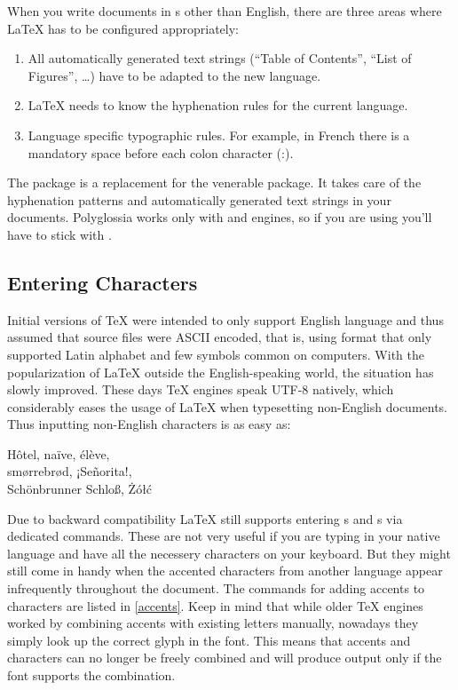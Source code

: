 When you write documents in s other than English, there are three
areas where \LaTeX{} has to be configured appropriately:

\begin{enumerate}
  \item All automatically generated text strings (\enquote{Table of Contents},
        \enquote{List of Figures}, \ldots) have to be adapted to the new
        language.
  \item \LaTeX{} needs to know the hyphenation rules for the current language.
  \item Language specific typographic rules. For example, in French there is a
        mandatory space before each colon character (:).
\end{enumerate}

The package  is a replacement for the venerable 
package. It takes care of the hyphenation patterns and automatically generated
text strings in your documents. Polyglossia works only with 
and  engines, so if you are using  you'll have to
stick with .

\subsection{Entering Characters}

Initial versions of \TeX{} were intended to only support English language and
thus assumed that source files were ASCII encoded, that is, using format that
only supported Latin alphabet and few symbols common on computers. With the
popularization of \LaTeX{} outside the English-speaking world, the situation
has slowly improved. These days \TeX{} engines speak UTF-8 natively, which
considerably eases the usage of \LaTeX{} when typesetting non-English
documents. Thus inputting non-English characters is as easy as:
\begin{chktexignore}  
\begin{example}
  Hôtel, naïve, élève, \\
  smørrebrød, ¡Señorita!, \\
  Schönbrunner Schloß, Żółć
\end{example}
\end{chktexignore}

Due to backward compatibility \LaTeX{} still supports entering s and
s via dedicated commands. These are not very useful if
you are typing in your native language and have all the necessery characters on
your keyboard. But they might still come in handy when the accented characters
from another language appear infrequently throughout the document. The commands
for adding accents to characters are listed in \autoref{accents}. Keep in mind
that while older \TeX{} engines worked by combining accents with existing
letters manually, nowadays they simply look up the correct glyph in the font.
This means that accents and characters can no longer be freely combined and
will produce output only if the font supports the combination.

